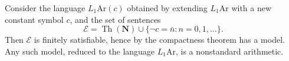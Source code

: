 Consider the language $L_1\mathrm{Ar}(c)$ obtained by extending $L_1\mathrm{Ar}$ with a new constant symbol $c$, and the set of sentences
$$\mathcal{E} = \operatorname{Th}(\mathbf{N}) \cup \{ \neg c = \bar{n} : n = 0, 1, \ldots \}.$$
Then $\mathcal{E}$ is finitely satisfiable, hence by the compactness theorem has a model. Any such model, reduced to the language $L_1\mathrm{Ar}$, is a nonstandard arithmetic.

